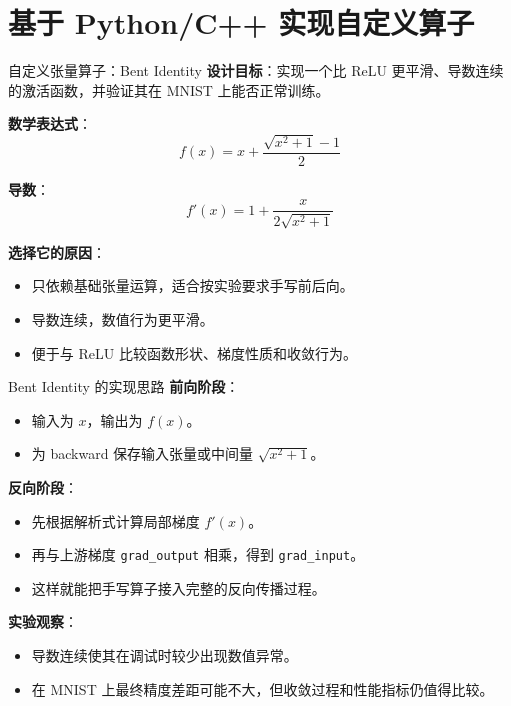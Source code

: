 \documentclass[10pt, aspectratio=169]{beamer}
\begin{document}
\section{基于 Python/C++ 实现自定义算子}

\begin{frame}{自定义张量算子：Bent Identity}
    \textbf{设计目标}：实现一个比 ReLU 更平滑、导数连续的激活函数，并验证其在 MNIST 上能否正常训练。
    \vspace{0.2cm}

    \textbf{数学表达式}：
    \[
        f(x) = x + \frac{\sqrt{x^2 + 1} - 1}{2}
    \]

    \textbf{导数}：
    \[
        f'(x) = 1 + \frac{x}{2\sqrt{x^2 + 1}}
    \]

    \vspace{0.15cm}
    \textbf{选择它的原因}：
    \begin{itemize}
            \item 只依赖基础张量运算，适合按实验要求手写前后向。
            \item 导数连续，数值行为更平滑。
            \item 便于与 ReLU 比较函数形状、梯度性质和收敛行为。
    \end{itemize}
\end{frame}

\begin{frame}{Bent Identity 的实现思路}
    \textbf{前向阶段}：
    \begin{itemize}
        \item 输入为 $x$，输出为 $f(x)$。
        \item 为 backward 保存输入张量或中间量 $\sqrt{x^2+1}$。
    \end{itemize}

    \vspace{0.15cm}
    \textbf{反向阶段}：
    \begin{itemize}
        \item 先根据解析式计算局部梯度 $f'(x)$。
        \item 再与上游梯度 \texttt{grad\_output} 相乘，得到 \texttt{grad\_input}。
        \item 这样就能把手写算子接入完整的反向传播过程。
    \end{itemize}

    \vspace{0.15cm}
    \textbf{实验观察}：
    \begin{itemize}
        \item 导数连续使其在调试时较少出现数值异常。
        \item 在 MNIST 上最终精度差距可能不大，但收敛过程和性能指标仍值得比较。
    \end{itemize}
\end{frame}
\end{document}
